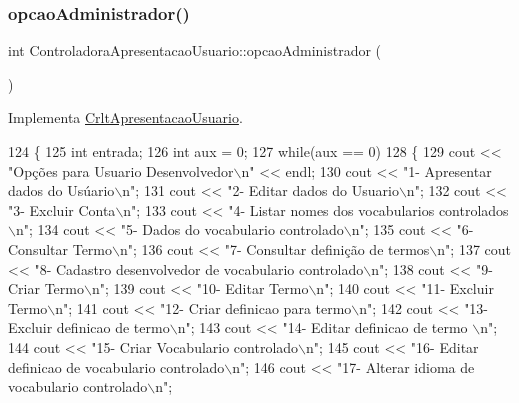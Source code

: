 \subsubsection{\texorpdfstring{opcao\+Administrador()}{opcaoAdministrador()}}
{\footnotesize\ttfamily int Controladora\+Apresentacao\+Usuario\+::opcao\+Administrador (\begin{DoxyParamCaption}{ }\end{DoxyParamCaption})\hspace{0.3cm}{\ttfamily [virtual]}}



Implementa \mbox{\hyperlink{class_crlt_apresentacao_usuario_aa4e0600a397ea82224441793424d7daa}{Crlt\+Apresentacao\+Usuario}}.


\begin{DoxyCode}
124 \{
125   \textcolor{keywordtype}{int} entrada;
126   \textcolor{keywordtype}{int} aux = 0;
127   \textcolor{keywordflow}{while}(aux == 0)
128   \{
129       cout << \textcolor{stringliteral}{"Opções para Usuario Desenvolvedor\(\backslash\)n"} << endl;
130       cout << \textcolor{stringliteral}{"1- Apresentar dados do Usúario\(\backslash\)n"};
131       cout << \textcolor{stringliteral}{"2- Editar dados do Usuario\(\backslash\)n"};
132       cout << \textcolor{stringliteral}{"3- Excluir Conta\(\backslash\)n"};
133       cout << \textcolor{stringliteral}{"4- Listar nomes dos vocabularios controlados\(\backslash\)n"};
134       cout << \textcolor{stringliteral}{"5- Dados do vocabulario controlado\(\backslash\)n"};
135       cout << \textcolor{stringliteral}{"6- Consultar Termo\(\backslash\)n"};
136       cout << \textcolor{stringliteral}{"7- Consultar definição de termos\(\backslash\)n"};
137       cout << \textcolor{stringliteral}{"8- Cadastro desenvolvedor de vocabulario controlado\(\backslash\)n"};
138       cout << \textcolor{stringliteral}{"9- Criar Termo\(\backslash\)n"};
139       cout << \textcolor{stringliteral}{"10- Editar Termo\(\backslash\)n"};
140       cout << \textcolor{stringliteral}{"11- Excluir Termo\(\backslash\)n"};
141       cout << \textcolor{stringliteral}{"12- Criar definicao para termo\(\backslash\)n"};
142       cout << \textcolor{stringliteral}{"13- Excluir definicao de termo\(\backslash\)n"};
143       cout << \textcolor{stringliteral}{"14- Editar definicao de termo \(\backslash\)n"};
144       cout << \textcolor{stringliteral}{"15- Criar Vocabulario controlado\(\backslash\)n"};
145       cout << \textcolor{stringliteral}{"16- Editar definicao de vocabulario controlado\(\backslash\)n"};
146       cout << \textcolor{stringliteral}{"17- Alterar idioma de vocabulario controlado\(\backslash\)n"};

\end{DoxyCode}
